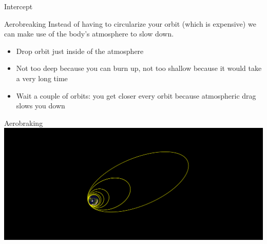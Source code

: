 {\begin{frame}[t]{Intercept}
\begin{block}{Aerobreaking}
        Instead of having to circularize your orbit (which is expensive) we can make use of the body's atmosphere to
        slow down.
        \begin{itemize}
            \item Drop orbit just inside of the atmosphere
            \item Not too deep because you can burn up, not too shallow because it would take a very long time
            \item Wait a couple of orbits: you get closer every orbit because atmospheric drag slows you down
        \end{itemize}
    \end{block}
\end{frame}
}
\begin{frame}[t]{}
    \begin{block}{Aerobraking}
        \includegraphics[width=\textwidth]{images/aerobraking}
    \end{block}
\end{frame}
